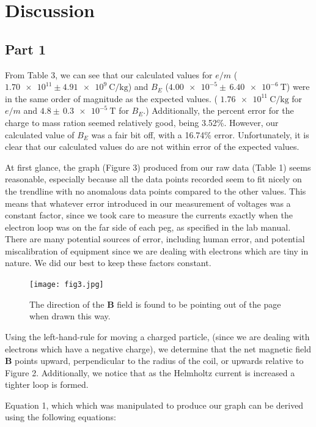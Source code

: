 \documentclass[letterpaper]{article}
\begin{document}
\section{Discussion}

\subsection{Part 1}


From Table 3, we can see that our calculated values for $e/m$
($\num{1.70e11} \pm \SI{4.91e9}{\coulomb\per\kilogram}$)
and $B_E$
($\num{4.00e-5} \pm \,\SI{6.40e-6}{\tesla}$) were in the same order of magnitude as the
expected values. ( $\SI{1.76e11}{\coulomb\per\kilogram}$ for $e/m$
and $4.8 \pm \,\SI{0.3e-5}{\tesla}$ for $B_E$.)
Additionally, the percent error for the charge to mass ration seemed relatively good, being 3.52\%.
However, our calculated value of $B_E$ was a fair bit off, with a 16.74\% error.
Unfortunately, it is clear that our calculated values do are not within error of the
expected values.

At first glance, the graph (Figure 3) produced from our raw data (Table 1) seems reasonable, especially
because all the data points recorded seem to fit nicely on the trendline with
no anomalous data points compared to the other values. This means that whatever error
introduced in our measurement of voltages was a constant factor, since we took care
to measure the currents exactly when the electron loop was on the far side of each peg, as specified in the
lab manual. There are many potential sources of error, including human error, and potential miscalibration of equipment since we are dealing
with electrons which are tiny in nature. We did our best to keep these factors constant.

\begin{figure}[H]
  \centering
  \texttt{[image: fig3.jpg]}
  \caption{The direction of the \textbf{B} field is found to be pointing out of the page when drawn this way.}
\end{figure}

Using the left-hand-rule for moving a charged particle, (since we are
dealing with electrons which have a negative charge), we determine that the net magnetic field \textbf{B}
points upward, perpendicular to the radius of the coil, or upwards relative to Figure 2. Additionally, we notice that
as the Helmholtz current is increased a tighter loop is formed.

Equation 1, which which was manipulated to produce our graph can be derived using the following equations:
\end{document}
